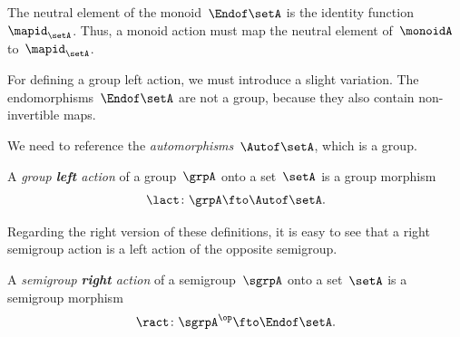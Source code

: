 The neutral element of the monoid~$\Endof\setA$ is the identity function~$\mapid_{\setA}$.
Thus, a monoid action must map the neutral element of~$\monoidA$ to~$\mapid_{\setA}$.
%


For defining a group left action, we must introduce a slight variation.
The endomorphisms~$\Endof\setA$ are not a group, because they also contain non-invertible maps.

We need to reference the \emph{automorphisms}~$\Autof\setA$, which is a group.

\begin{ctdefinition}\label{def:group-left-action}
  A \emph{group \textbf{left} action} of a group~$\grpA$ onto a set~$\setA$ is a group morphism
  \begin{equation}\label{eq:act-group}
    \lact \colon \grpA \fto \Autof\setA.
  \end{equation}
\end{ctdefinition}

Regarding the right version of these definitions, it is easy to see that a right semigroup action is a left action of the opposite semigroup.

\begin{ctdefinition}\label{def:semigroup-right-action}
  A \emph{semigroup \textbf{right} action} of a semigroup~$\sgrpA$ onto a set~$\setA$ is a semigroup morphism
  \begin{equation}
    \ract \colon \sgrpA^{\op} \fto \Endof\setA.
  \end{equation}
\end{ctdefinition}

